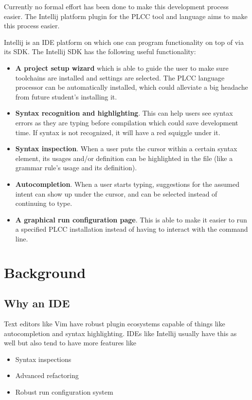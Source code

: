 \documentclass[conference, letterpaper]{IEEEtran}
\begin{document}
Currently no formal effort has been done to make this development process easier.
The Intellij platform plugin for the PLCC tool and language aims to make this process easier.
\par Intellij is an IDE platform on which one can program functionality on top of via its SDK\@.
The Intellij SDK has the following useful functionality:
\begin{itemize}
    \item \textbf{A project setup wizard} which is able to guide the user to make sure toolchains are installed and settings are selected.
    The PLCC language processor can be automatically installed, which could alleviate a big headache from future student's installing it.
    \item \textbf{Syntax recognition and highlighting}.
    This can help users see syntax errors as they are typing before compilation which could save development time.
    If syntax is not recognized, it will have a red squiggle under it.
    \item \textbf{Syntax inspection}.
    When a user puts the cursor within a certain syntax element, its usages and/or definition can be highlighted in the file (like a grammar rule's usage and its definition).
    \item \textbf{Autocompletion}.
    When a user starts typing, suggestions for the assumed intent can show up under the cursor, and can be selected instead of continuing to type.
    \item \textbf{A graphical run configuration page}.
    This is able to make it easier to run a specified PLCC installation instead of having to interact with the command line.
\end{itemize}


\section{Background}\label{sec:background}
\subsection{Why an IDE}\label{subsec:why-an-ide}
Text editors like Vim have robust plugin ecosystems capable of things like autocompletion and syntax highlighting.
IDEs like Intellij usually have this as well but also tend to have more features like
\begin{itemize}
    \item Syntax inspections
    \item Advanced refactoring
    \item Robust run configuration system
\end{itemize}
\end{document}
